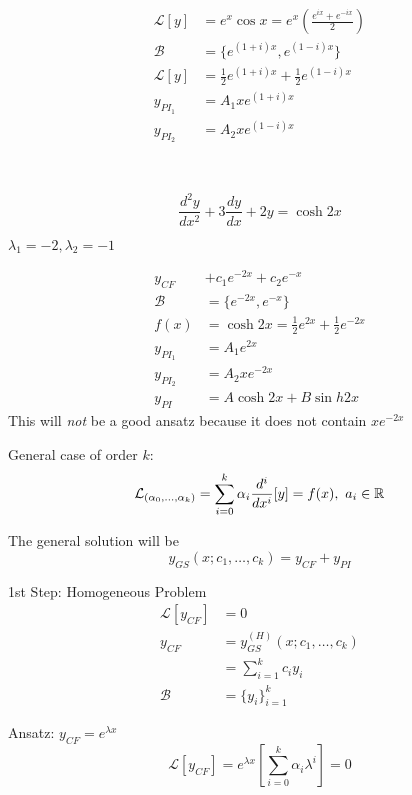 \documentclass[twoside]{scrartcl}
\begin{document}
\begin{example}
\[
\begin{aligned}
  \mathcal{L}[y] &= e^x\cos x = e^x\left(\frac{e^{ix} + e^{-ix}}{2}\right)\\
  \mathcal{B} &= \{e^{(1+i)x},e^{(1-i)x}\}\\
  \mathcal{L}[y] &= \frac{1}{2}e^{(1+i)x} + \frac{1}{2}e^{(1-i)x}\\
  y_{PI_1} &= A_1xe^{(1+i)x}\\
  y_{PI_2} &= A_2xe^{(1-i)x}
\end{aligned}
\]
\end{example}~\vspace*{5pt}

\begin{example}
\[\frac{d^2y}{dx^2} + 3\frac{dy}{dx} + 2y = \cosh 2x\]	

$\lambda_1 = -2, \lambda_2 = -1$

\[
\begin{aligned}
  y_{CF} &+ c_1e^{-2x} + c_2e^{-x}\\
  \mathcal{B} &= \{e^{-2x},e^{-x}\}\\
  f(x) &= \cosh 2x = \frac{1}{2}e^{2x} + \frac{1}{2}e^{-2x}\\
  y_{PI_1} &= A_1e^{2x}\\
  y_{PI_2} &= A_2xe^{-2x}\\
  y_{PI} &= A\cosh 2x + B\sin h 2x 
\end{aligned}
\]
This will \emph{not} be a good ansatz because it does not contain $xe^{-2x}$

\end{example}


General  case of order $k$: 
\[\mathcal{L}_{(\alpha_0,\dots,\alpha_k)} = \sum_{i=0}^k \alpha_i\frac{d^i}{dx^i}[y] = f(x),~ a_i\in\mathbb{R}\]

The general solution will be
\[y_{GS}(x;c_1,\dots,c_k) = y_{CF} + y_{PI}\]

1st Step: Homogeneous Problem
\[
\begin{aligned}
  \mathcal{L}[y_{CF}] &= 0\\
  y_{CF} &= y_{GS}^{(H)}(x;c_1,\dots,c_k)\\
  &= \sum_{i=1}^kc_iy_i\\
  \mathcal{B} &= \{y_i\}_{i=1}^{k}
\end{aligned}
\]

Ansatz: $y_{CF} = e^{\lambda x}$
\[\mathcal{L}[y_{CF}] = e^{\lambda x}\left[\sum_{i=0}^k\alpha_i\lambda^i\right] = 0\]
\end{document}
